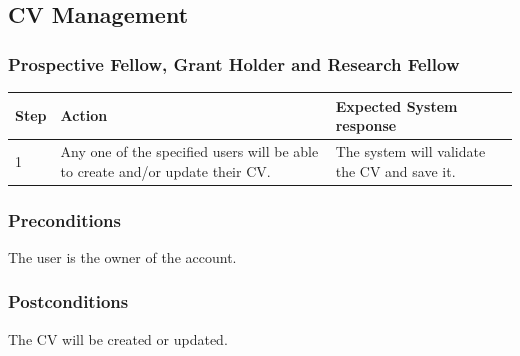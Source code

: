 \documentclass[12pt]{article}
\begin{document}
\subsection{CV Management}
\subsubsection{Prospective Fellow, Grant Holder and Research Fellow}
\begin{center}
	\begin{tabular}{|l|p{6cm}|p{8cm}|}
	\hline
	Step & Action & Expected System response \\
	\hline
	1 & Any one of the specified users will be able to create and/or update their CV. & The system will validate the CV and save it. \\
	\hline
	
	\end{tabular}
\end{center}

\subsubsection*{Preconditions}
The user is the owner of the account.

\subsubsection*{Postconditions}
The CV will be created or updated.

\newpage

\end{document}
